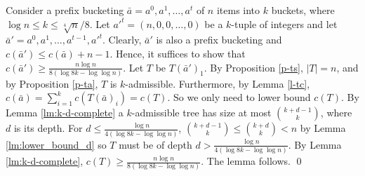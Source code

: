 \documentclass[runningheads,a4paper]{llncs}
\newenvironment{proofof}[1]{\noindent{\it Proof of #1. }} {{\qed}}
\begin{document}
\begin{proofof}{Lemma \ref{l-lbb}}
Consider a prefix bucketing $\bar{a} = a^0,a^1,\dots,a^t$ of $n$ items into $k$ buckets, 
where $\log n \le k \le \sqrt[4]{n}/8$. Let $a'^t = (n,0,0,\dots,0)$ be a $k$-tuple of integers and
let  $\bar{a}' = a^0,a^1,\dots,a^{t-1},a'^t$. Clearly, $\bar{a}'$ is also a prefix bucketing and $c(\bar{a}') \le c(\bar{a}) + n-1$. Hence, it suffices to 
show that $c(\bar{a}') \ge  \frac{n \log n}{8 (\log 8k - \log \log n)}$. Let $T$ be $T(\bar{a}')_1$. By Proposition \ref{p-ts}, $|T|=n$, and by Proposition \ref{p-ta}, $T$ is $k$-admissible.
Furthermore, by Lemma \ref{l-tc},  $c(\bar{a}) = \sum_{i=1}^k c(T(\bar{a})_i) = c(T)$. So we only need to lower bound $c(T)$. By Lemma \ref{lm:k-d-complete}
a $k$-admissible tree has size at most $\binom{k + d - 1}{k}$, where $d$ is its depth. For $d \le  \frac{\log n}{4 (\log 8k - \log \log n)}$,  $\binom{k + d - 1}{k} \le \binom{k + d}{k} < n$
by Lemma \ref{lm:lower_bound_d} so $T$ must be of depth $d > \frac{\log n}{4 (\log 8k - \log \log n)}$.
By Lemma \ref{lm:k-d-complete}, $c(T) \ge \frac{n \log n}{8 (\log 8k - \log \log n)}$. The lemma follows.
\end{proofof}
\end{document}
